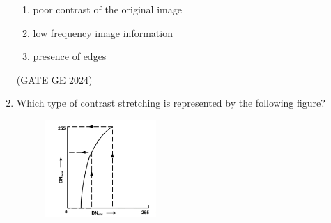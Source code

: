 \documentclass[journal,12pt,onecolumn]{IEEEtran}
\theoremstyle{remark}
\begin{document}
\begin{enumerate}
\begin{enumerate}
\item poor contrast of the original image
\item low frequency image information
\item 
presence of edges
\end{enumerate}
\hfill{(GATE GE $2024$)}
\bigskip
\item Which type of contrast stretching is represented by the following figure?\\
\begin{figure}[h!]
    \centering
    \includegraphics[width=0.4\textwidth]{figs/fig9.png}
\end{figure}


\end{enumerate}
\end{document}

